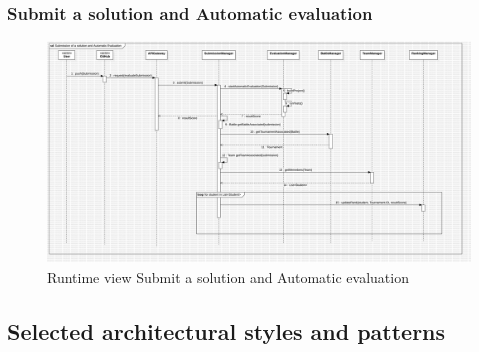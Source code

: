 \begin{itemize}
\subsubsection*{Submit a solution and Automatic evaluation}
\begin{figure}[H]
    \centering
    \includegraphics[width=\textwidth]{Diagrams/SolutionSubmissionSD.jpg}
    \caption{Runtime view Submit a solution and Automatic evaluation}
    \label{fig:runtime_view_submit_solution}
\end{figure}
\clearpage
\subsection{Selected architectural styles and patterns}

\end{itemize}
